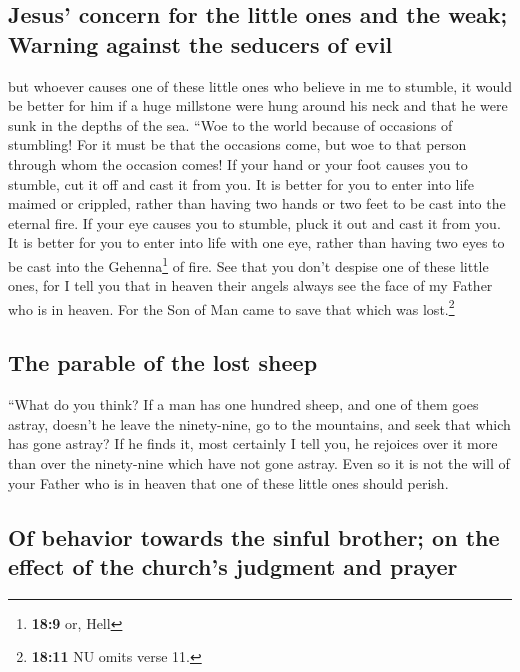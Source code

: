 \hypertarget{jesus-concern-for-the-little-ones-and-the-weak-warning-against-the-seducers-of-evil}{%
\subsection{Jesus' concern for the little ones and the weak; Warning
against the seducers of
evil}\label{jesus-concern-for-the-little-ones-and-the-weak-warning-against-the-seducers-of-evil}}

 but whoever causes one of these little ones who believe
in me to stumble, it would be better for him if a huge millstone were
hung around his neck and that he were sunk in the depths of the sea.
 ``Woe to the world because of occasions of stumbling! For
it must be that the occasions come, but woe to that person through whom
the occasion comes!  If your hand or your foot causes you
to stumble, cut it off and cast it from you. It is better for you to
enter into life maimed or crippled, rather than having two hands or two
feet to be cast into the eternal fire.  If your eye causes
you to stumble, pluck it out and cast it from you. It is better for you
to enter into life with one eye, rather than having two eyes to be cast
into the Gehenna\footnote{\textbf{18:9} or, Hell} of fire.
 See that you don't despise one of these little ones, for
I tell you that in heaven their angels always see the face of my Father
who is in heaven.  For the Son of Man came to save that
which was lost.\footnote{\textbf{18:11} NU omits verse 11.}

\hypertarget{the-parable-of-the-lost-sheep}{%
\subsection{The parable of the lost
sheep}\label{the-parable-of-the-lost-sheep}}

 ``What do you think? If a man has one hundred sheep, and
one of them goes astray, doesn't he leave the ninety-nine, go to the
mountains, and seek that which has gone astray?  If he
finds it, most certainly I tell you, he rejoices over it more than over
the ninety-nine which have not gone astray.  Even so it
is not the will of your Father who is in heaven that one of these little
ones should perish.

\hypertarget{of-behavior-towards-the-sinful-brother-on-the-effect-of-the-churchs-judgment-and-prayer}{%
\subsection{Of behavior towards the sinful brother; on the effect of the
church's judgment and
prayer}\label{of-behavior-towards-the-sinful-brother-on-the-effect-of-the-churchs-judgment-and-prayer}}

